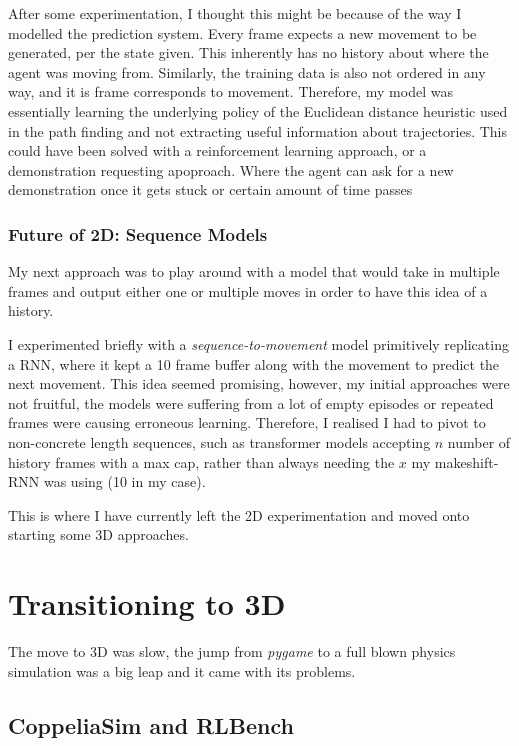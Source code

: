 After some experimentation, I thought this might be because of the way I modelled the prediction system. Every frame expects a new movement to be generated, per the state given. This inherently has no history about where the agent was moving from. Similarly, the training data is also not ordered in any way, and it is frame corresponds to movement. Therefore, my model was essentially learning the underlying policy of the Euclidean distance heuristic used in the path finding and not extracting useful information about trajectories. This could have been solved with a reinforcement learning approach, or a demonstration requesting apoproach. Where the agent can ask for a new demonstration once it gets stuck or certain amount of time passes 

\subsubsection{Future of 2D: Sequence Models}
My next approach was to play around with a model that would take in multiple frames and output either one or multiple moves in order to have this idea of a history.

I experimented briefly with a \emph{sequence-to-movement} model primitively replicating a RNN, where it kept a 10 frame buffer along with the movement to predict the next movement. This idea seemed promising, however, my initial approaches were not fruitful, the models were suffering from a lot of empty episodes or repeated frames were causing erroneous learning. Therefore, I realised I had to pivot to non-concrete length sequences, such as transformer models accepting $n$ number of history frames with a max cap, rather than always needing the $x$ my makeshift-RNN was using (10 in my case). 

This is where I have currently left the 2D experimentation and moved onto starting some 3D approaches.

\section{Transitioning to 3D}
The move to 3D was slow, the jump from \emph{pygame} to a full blown physics simulation was a big leap and it came with its problems.

\subsection{CoppeliaSim and RLBench}

